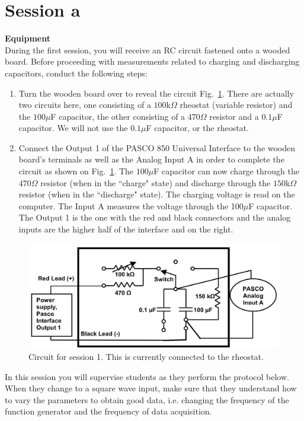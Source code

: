 \documentclass[12pt]{report}
\begin{document}
\section{Session a}
\noindent \large \textbf{Equipment} \normalsize \\
During the first session, you will receive an RC circuit fastened onto a wooded board. Before proceeding with measurements related to charging and discharging capacitors, conduct the following steps:
\begin{enumerate}
\item Turn the wooden board over to reveal the circuit Fig.~\ref{Fig:lab2-session1-circuit1}. There are actually two circuits here, one consisting of a $100$k$\Omega$ rheostat (variable resistor) and the $100\mu$F capacitor, the other consisting of a $470\Omega$ resistor and a $0.1\mu$F capacitor. We will not use the $0.1 \mu$F capacitor, or the rheostat.
\item Connect the Output 1 of the PASCO 850 Universal Interface to the wooden board's terminals as well as the Analog Input A in order to complete the circuit as shown on Fig.~\ref{Fig:lab2-session1-circuit1}. The $100\mu$F capacitor can now charge through the $470\Omega$ resistor (when in the ``charge" state) and discharge through the $150$k$\Omega$ resistor (when in the ``discharge" state). The charging voltage is read on the computer. The Input A measures the voltage through the 100$\mu$F capacitor. The Output 1 is the one with the red and black connectors and the analog inputs are the higher half of the interface and on the right.
\end{enumerate}

\begin{figure}[h]
\centering
\includegraphics[width=0.75\linewidth]{lab2-session1-circuit2}
\caption{Circuit for session 1. This is currently connected to the rheostat.}
\label{Fig:lab2-session1-circuit1}
\end{figure}

\begin{tcolorbox}[title=Session \#1]
In this session you will supervise students as they perform the protocol below. When they change to a square wave input, make sure that they understand how to vary the parameters to obtain good data, i.e. changing the frequency of the function generator and the frequency of data acquisition.
\end{tcolorbox}
\end{document}
